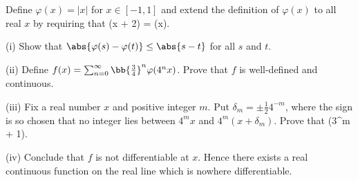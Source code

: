 \begin{problem}
Define $\varphi(x) = |x|$ for $x\in [-1, 1]$ and extend the definition of $\varphi(x)$ to all real $x$ by requiring that
\be
\varphi(x + 2) = \varphi(x).
\ee
\ben
\item [(i)] Show that $\abs{\varphi(s) - \varphi(t)} \leq \abs{s - t}$ for all $s$ and $t$.
\item [(ii)] Define $f(x) = \sum^\infty_{n=0} \bb{\frac 34}^n \varphi(4^nx)$. Prove that $f$ is well-defined and continuous.
\item [(iii)] Fix a real number $x$ and positive integer $m$. Put $\delta_m = \pm \frac 12 4^{-m}$, where the sign is so chosen that no integer lies between $4^m x$ and $4^m(x + \delta_m)$. Prove that
\be
{} \geq {} (3^m + 1).
\ee
\item [(iv)] Conclude that $f$ is not differentiable at $x$. Hence there exists a real continuous function on the real line which is nowhere differentiable.
\een
\end{problem}

